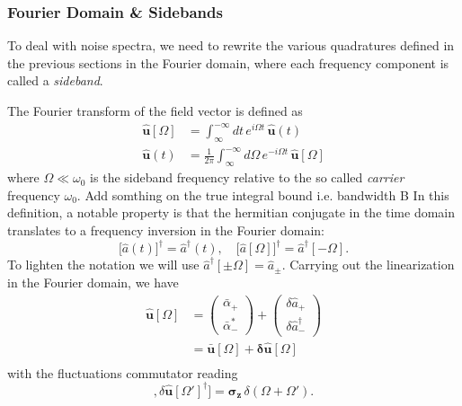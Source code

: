 \subsubsection{Fourier Domain \& Sidebands}
To deal with noise spectra, we need to rewrite the various quadratures defined in the previous sections in the Fourier domain, where each frequency component is called a \textit{sideband}.


The Fourier transform of the field vector is defined as
\begin{equation}
  \begin{split}
    \mathbf{\hat{u}}[\Omega] &=\int_{\infty}^{-\infty}  dt \, e^{i\Omega t} \, \mathbf{\hat{u}}(t)\\
\mathbf{\hat{u}}(t) &= \frac{1}{2\pi}\int_{\infty}^{-\infty}  d\Omega \, e^{-i\Omega t} \, \mathbf{\hat{u}}[\Omega]
  \end{split}
\end{equation}
where $\Omega \ll \omega_0$ is the sideband frequency relative to the so called \textit{carrier} frequency $\omega_0$. \color{red}  Add somthing on the true integral bound i.e. bandwidth B  \color{black}In this definition, a notable property is that the hermitian conjugate in the time domain translates to a frequency inversion in the Fourier domain:
\begin{equation}
   \Big[\hat{a}(t)\Big]^{\dagger} = \hat{a}^\dagger(t),  \quad
   \Big[\hat{a}[\Omega]\Big]^{\dagger}  = \hat{a}^\dagger[-\Omega].
\end{equation}
To lighten the notation we will use $\hat{a}^\dagger[\pm\Omega]=\hat{a}_\pm$. Carrying out the linearization in the Fourier domain, we have
\begin{equation}
  \begin{split}
      \mathbf{\hat{u}}[\Omega] &=\begin{pmatrix} \bar{\alpha}_+ \\ \bar{\alpha}^*_- \end{pmatrix} + \begin{pmatrix} \delta\hat{a}_+ \\ \delta\hat{a}^\dagger_- \end{pmatrix} \\
      & = \mathbf{\bar{u}}[\Omega]+ \mathbf{\delta \hat{u}}[\Omega]\\
  \end{split}
\end{equation}
with the fluctuations commutator reading
\begin{equation}
  [\delta \mathbf{\hat{u}}[\Omega], \delta \mathbf{\hat{u}}[\Omega']^{\dagger}] = \mathbf{\sigma_z} \, \delta(\Omega + \Omega').
\end{equation}
